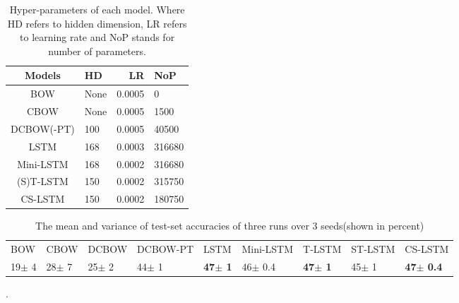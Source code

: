 \begin{table}[t!]
    \begin{center}
    \small
    \begin{tabular}{|c|l|r|l|}
        \hline \bf Models & \bf HD & \bf LR &\bf NoP \\ \hline
        BOW & None & 0.0005 &0\\
        CBOW & None & 0.0005 & 1500\\
        DCBOW(-PT)& 100 & 0.0005 &40500\\
        LSTM&168 & 0.0003 &316680\\
        Mini-LSTM&168 & 0.0002&316680\\
        (S)T-LSTM&150 & 0.0002&315750\\
        CS-LSTM&150 & 0.0002& 180750\\
        \hline
    \end{tabular}
    \end{center}
    \label{tab:parameters}
    \caption{Hyper-parameters of each model. Where HD refers to hidden dimension, LR refers to learning rate and NoP stands for number of parameters.}
\end{table}

\begin{table*}[t]
    \centering
    \small
    \begin{tabular}{lllllllll}
    BOW  & CBOW & DCBOW & DCBOW-PT & LSTM & Mini-LSTM & T-LSTM & ST-LSTM &CS-LSTM \\
    19$\pm$ 4 & 28$\pm$ 7 & 25$\pm$ 2 & 44$\pm$ 1 & \textbf{47$\pm$ 1} & 46$\pm$ 0.4 & \textbf{47$\pm$ 1} & 45$\pm$ 1& \textbf{47$\pm$ 0.4}
    \end{tabular}
    \label{table: results-acc}
    \caption{The mean and variance of test-set accuracies of three runs over 3 seeds(shown in percent)}.
\end{table*}


